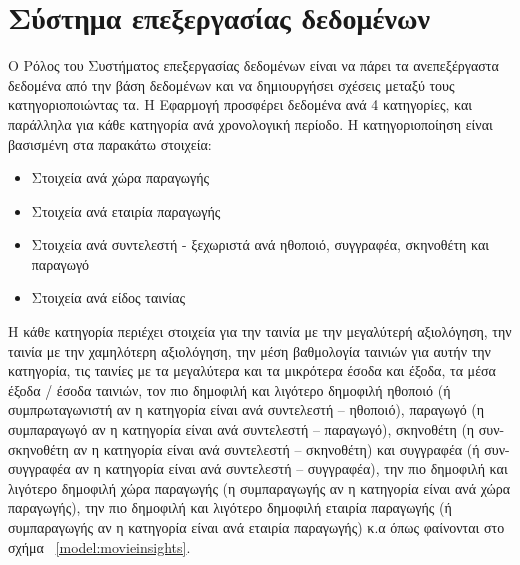 \section{Σύστημα επεξεργασίας δεδομένων}
Ο Ρόλος του Συστήματος επεξεργασίας δεδομένων είναι να πάρει τα ανεπεξέργαστα δεδομένα από την βάση δεδομένων και να δημιουργήσει σχέσεις μεταξύ τους κατηγοριοποιώντας τα. Η Εφαρμογή προσφέρει δεδομένα ανά 4 κατηγορίες, και παράλληλα για κάθε κατηγορία ανά χρονολογική περίοδο. Η κατηγοριοποίηση είναι βασισμένη στα παρακάτω στοιχεία:
\begin{itemize}
    \item Στοιχεία ανά χώρα παραγωγής
    \item Στοιχεία ανά εταιρία παραγωγής
    \item Στοιχεία ανά συντελεστή - ξεχωριστά ανά ηθοποιό, συγγραφέα, σκηνοθέτη και παραγωγό
    \item Στοιχεία ανά είδος ταινίας
\end{itemize}

Η κάθε κατηγορία περιέχει στοιχεία για
την ταινία με την μεγαλύτερή αξιολόγηση, 
την ταινία με την χαμηλότερη αξιολόγηση, 
την μέση βαθμολογία ταινιών για αυτήν την κατηγορία, 
τις ταινίες με τα μεγαλύτερα και τα μικρότερα έσοδα και έξοδα, 
τα μέσα έξοδα / έσοδα ταινιών, 
τον πιο δημοφιλή και λιγότερο δημοφιλή ηθοποιό (ή συμπρωταγωνιστή αν η κατηγορία είναι ανά συντελεστή -- ηθοποιό), 
παραγωγό (η συμπαραγωγό αν η κατηγορία είναι ανά συντελεστή -- παραγωγό), 
σκηνοθέτη (η συν-σκηνοθέτη αν η κατηγορία είναι ανά συντελεστή -- σκηνοθέτη) και 
συγγραφέα (ή συν-συγγραφέα αν η κατηγορία είναι ανά συντελεστή -- συγγραφέα), 
την πιο δημοφιλή και λιγότερο δημοφιλή χώρα παραγωγής (η συμπαραγωγής αν η κατηγορία είναι ανά χώρα παραγωγής), 
την πιο δημοφιλή και λιγότερο δημοφιλή εταιρία παραγωγής (ή συμπαραγωγής αν η κατηγορία είναι ανά εταιρία παραγωγής) κ.α
όπως φαίνονται στο σχήμα ~\ref{model:movieinsights}.

